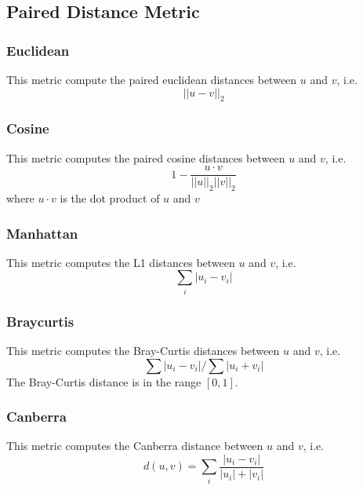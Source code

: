 \subsection{Paired Distance Metric}
\label{subsection:pairedDistance}

\subsubsection{Euclidean}
This metric compute the paired euclidean distances between $u$ and $v$, i.e.
\begin{equation}
  {||u-v||}_2
\end{equation}


\subsubsection{Cosine}
This metric computes the paired cosine distances between $u$ and $v$, i.e.
\begin{equation}
  1 - \frac{u \cdot v}{||u||_2 ||v||_2}
\end{equation}
where $u \cdot v$ is the dot product of $u$ and $v$


\subsubsection{Manhattan}
This metric computes the L1 distances between $u$ and $v$, i.e.
\begin{equation}
  \sum_i {\left| u_i - v_i \right|}
\end{equation}


\subsubsection{Braycurtis}
This metric computes the Bray-Curtis distances between $u$ and $v$, i.e.
\begin{equation}
  \sum{|u_i-v_i|} / \sum{|u_i+v_i|}
\end{equation}
The Bray-Curtis distance is in the range $[0, 1]$.

\subsubsection{Canberra}
This metric computes the Canberra distance between $u$ and $v$, i.e.
\begin{equation}
  d(u,v) = \sum_i \frac{|u_i-v_i|}{|u_i|+|v_i|}
\end{equation}

